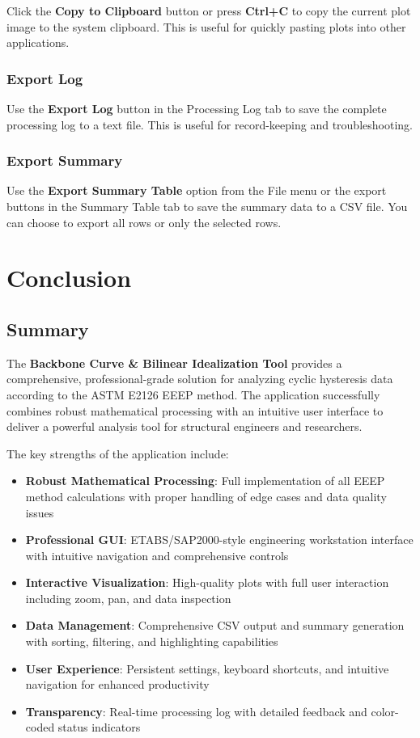 \documentclass[11pt,a4paper]{article}
\begin{document}
Click the \textbf{Copy to Clipboard} button or press \textbf{Ctrl+C} to copy the current plot image to the system clipboard. This is useful for quickly pasting plots into other applications.

\subsubsection{Export Log}

Use the \textbf{Export Log} button in the Processing Log tab to save the complete processing log to a text file. This is useful for record-keeping and troubleshooting.

\subsubsection{Export Summary}

Use the \textbf{Export Summary Table} option from the File menu or the export buttons in the Summary Table tab to save the summary data to a CSV file. You can choose to export all rows or only the selected rows.

\section{Conclusion}

\subsection{Summary}

The \textbf{Backbone Curve \& Bilinear Idealization Tool} provides a comprehensive, professional-grade solution for analyzing cyclic hysteresis data according to the ASTM E2126 EEEP method. The application successfully combines robust mathematical processing with an intuitive user interface to deliver a powerful analysis tool for structural engineers and researchers.

The key strengths of the application include:

\begin{itemize}
    \item \textbf{Robust Mathematical Processing}: Full implementation of all EEEP method calculations with proper handling of edge cases and data quality issues
    \item \textbf{Professional GUI}: ETABS/SAP2000-style engineering workstation interface with intuitive navigation and comprehensive controls
    \item \textbf{Interactive Visualization}: High-quality plots with full user interaction including zoom, pan, and data inspection
    \item \textbf{Data Management}: Comprehensive CSV output and summary generation with sorting, filtering, and highlighting capabilities
    \item \textbf{User Experience}: Persistent settings, keyboard shortcuts, and intuitive navigation for enhanced productivity
    \item \textbf{Transparency}: Real-time processing log with detailed feedback and color-coded status indicators
\end{itemize}
\end{document}
